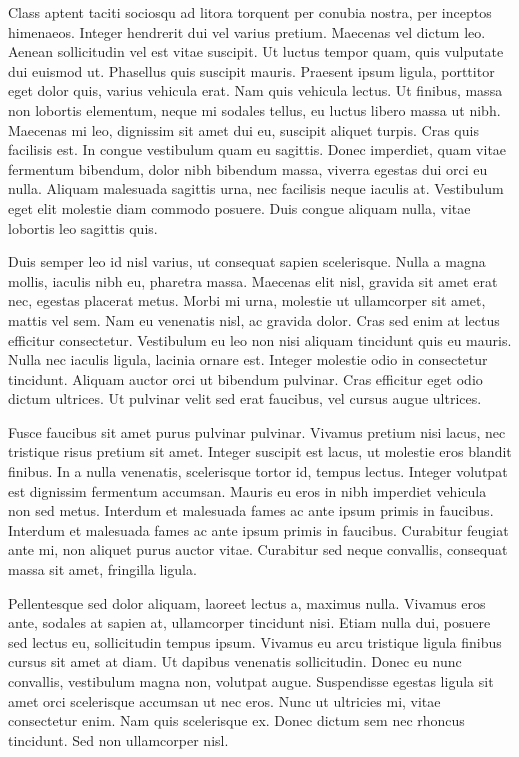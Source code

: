 Class aptent taciti sociosqu ad litora torquent per conubia nostra, per inceptos himenaeos. Integer hendrerit dui vel varius pretium. Maecenas vel dictum leo. Aenean sollicitudin vel est vitae suscipit. Ut luctus tempor quam, quis vulputate dui euismod ut. Phasellus quis suscipit mauris. Praesent ipsum ligula, porttitor eget dolor quis, varius vehicula erat. Nam quis vehicula lectus. Ut finibus, massa non lobortis elementum, neque mi sodales tellus, eu luctus libero massa ut nibh. Maecenas mi leo, dignissim sit amet dui eu, suscipit aliquet turpis. Cras quis facilisis est. In congue vestibulum quam eu sagittis. Donec imperdiet, quam vitae fermentum bibendum, dolor nibh bibendum massa, viverra egestas dui orci eu nulla. Aliquam malesuada sagittis urna, nec facilisis neque iaculis at. Vestibulum eget elit molestie diam commodo posuere. Duis congue aliquam nulla, vitae lobortis leo sagittis quis.

Duis semper leo id nisl varius, ut consequat sapien scelerisque. Nulla a magna mollis, iaculis nibh eu, pharetra massa. Maecenas elit nisl, gravida sit amet erat nec, egestas placerat metus. Morbi mi urna, molestie ut ullamcorper sit amet, mattis vel sem. Nam eu venenatis nisl, ac gravida dolor. Cras sed enim at lectus efficitur consectetur. Vestibulum eu leo non nisi aliquam tincidunt quis eu mauris. Nulla nec iaculis ligula, lacinia ornare est. Integer molestie odio in consectetur tincidunt. Aliquam auctor orci ut bibendum pulvinar. Cras efficitur eget odio dictum ultrices. Ut pulvinar velit sed erat faucibus, vel cursus augue ultrices.

Fusce faucibus sit amet purus pulvinar pulvinar. Vivamus pretium nisi lacus, nec tristique risus pretium sit amet. Integer suscipit est lacus, ut molestie eros blandit finibus. In a nulla venenatis, scelerisque tortor id, tempus lectus. Integer volutpat est dignissim fermentum accumsan. Mauris eu eros in nibh imperdiet vehicula non sed metus. Interdum et malesuada fames ac ante ipsum primis in faucibus. Interdum et malesuada fames ac ante ipsum primis in faucibus. Curabitur feugiat ante mi, non aliquet purus auctor vitae. Curabitur sed neque convallis, consequat massa sit amet, fringilla ligula.

Pellentesque sed dolor aliquam, laoreet lectus a, maximus nulla. Vivamus eros ante, sodales at sapien at, ullamcorper tincidunt nisi. Etiam nulla dui, posuere sed lectus eu, sollicitudin tempus ipsum. Vivamus eu arcu tristique ligula finibus cursus sit amet at diam. Ut dapibus venenatis sollicitudin. Donec eu nunc convallis, vestibulum magna non, volutpat augue. Suspendisse egestas ligula sit amet orci scelerisque accumsan ut nec eros. Nunc ut ultricies mi, vitae consectetur enim. Nam quis scelerisque ex. Donec dictum sem nec rhoncus tincidunt. Sed non ullamcorper nisl.

